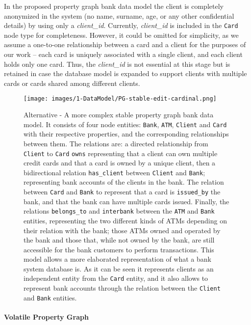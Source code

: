 

In the proposed property graph bank data model the client is completely anonymized in the system (no name, surname, age, or any other confidential details) by using only a \emph{client\_id}. Currently, \emph{client\_id} is included in the \texttt{Card} node type for completeness. However, it could be omitted for simplicity, as we assume a one-to-one relationship between a card and a client for the purposes of our work -- each card is uniquely associated with a single client, and each client holds only one card. Thus, the \emph{client\_id} is not essential at this stage but is retained in case the database model is expanded to support clients with multiple cards or cards shared among different clients.

\begin{figure}[H]
  \centering
  \texttt{[image: images/1-DataModel/PG-stable-edit-cardinal.png]}
  \caption{Alternative - A more complex stable property graph bank data model. It consists of four node entities: \texttt{Bank}, \texttt{ATM}, \texttt{Client} and \texttt{Card} with their respective properties, and the corresponding relationships between them. The relations are: a directed relationship from \texttt{Client} to \texttt{Card} \texttt{owns} representing that a client can own multiple credit cards and that a card is owned by a unique client, then a bidirectional relation \texttt{has\_client} between \texttt{Client} and \texttt{Bank}; representing bank accounts of the clients in the bank. The relation between \texttt{Card} and \texttt{Bank} to represent that a card is \texttt{issued\_by} the bank, and that the bank can have multiple cards issued. Finally, the relations \texttt{belongs\_to} and \texttt{interbank} between the \texttt{ATM} and \texttt{Bank} entities, representing the two different kinds of ATMs depending on their relation with the bank; those ATMs owned and operated by the bank and those that, while not owned by the bank, are still accessible for the bank customers to perform transactions. This model allows a more elaborated representation of what a bank system database is. As it can be seen it represents clients as an independent entity from the \texttt{Card} entity, and it also allows to represent bank accounts through the relation between the \texttt{Client} and \texttt{Bank} entities. }
  \label{img:pg-stable-big}
\end{figure}


\paragraph*{Volatile Property Graph\\\\}\label{section:volatile-pg}


